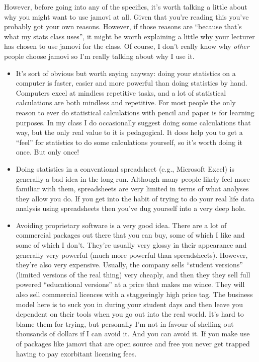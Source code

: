 However, before going into any of the specifics, it's worth talking a little about why you might want to use jamovi at all. Given that you're reading this you've probably got your own reasons. However, if those reasons are ``because that's what my stats class uses'', it might be worth explaining a little why your lecturer has chosen to use jamovi for the class. Of course, I don't really know why {\it other} people choose jamovi so I'm really talking about why I use it.
\begin{itemize}
\item It's sort of obvious but worth saying anyway: doing your statistics on a computer is faster, easier and more powerful than doing statistics by hand. Computers excel at mindless repetitive tasks, and a lot of statistical calculations are both mindless and repetitive. For most people the only reason to ever do statistical calculations with pencil and paper is for learning purposes. In my class I do occasionally suggest doing some calculations that way, but the only real value to it is pedagogical. It does help you to get a ``feel'' for statistics to do some calculations yourself, so it's worth doing it once. But only once!
\item Doing statistics in a conventional spreadsheet (e.g., Microsoft Excel) is generally a bad idea in the long run. Although many people likely feel more familiar with them, spreadsheets are very limited in terms of what analyses they allow you do. If you get into the habit of trying to do your real life data analysis using spreadsheets then you've dug yourself into a very deep hole.
\item Avoiding proprietary software is a very good idea. There are a lot of commercial packages out there that you can buy, some of which I like and some of which I don't. They're usually very glossy in their appearance and generally very powerful (much more powerful than spreadsheets). However, they're also very expensive. Usually, the company sells ``student versions'' (limited versions of the real thing) very cheaply, and then they they sell full powered ``educational versions'' at a price that makes me wince. They will also sell commercial licences with a staggeringly high price tag. The business model here is to suck you in during your student days and then leave you dependent on their tools when you go out into the real world. It's hard to blame them for trying, but personally I'm not in favour of shelling out thousands of dollars if I can avoid it. And you can avoid it. If you make use of packages like jamovi that are open source and free you never get trapped having to pay exorbitant licensing fees. 

\end{itemize}
